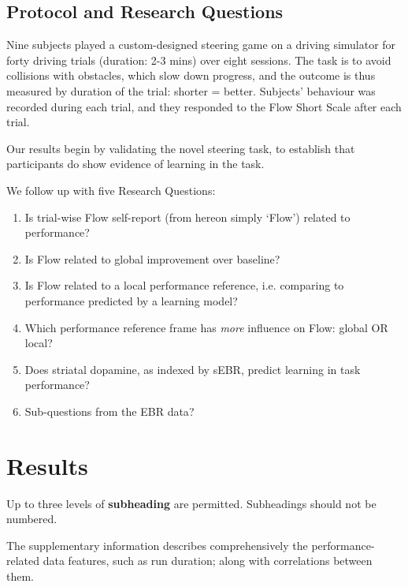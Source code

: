\documentclass[fleqn,10pt]{wlscirep}
\begin{document}
\subsection*{Protocol and Research Questions}
Nine subjects played a custom-designed steering game on a driving simulator for forty driving trials (duration: 2-3 mins) over eight sessions. The task is to avoid collisions with obstacles, which slow down progress, and the outcome is thus measured by duration of the trial: shorter = better. Subjects' behaviour was recorded during each trial, and they responded to the Flow Short Scale after each trial.

Our results begin by validating the novel steering task, to establish that participants do show evidence of learning in the task.

We follow up with five Research Questions:
\begin{enumerate}
	\item Is trial-wise Flow self-report (from hereon simply `Flow') related to performance?
	\item Is Flow related to global improvement over baseline?
	\item Is Flow related to a local performance reference, i.e. comparing to performance predicted by a learning model?
	\item Which performance reference frame has {\it more} influence on Flow: global OR local?

	\item Does striatal dopamine, as indexed by sEBR, predict learning in task performance?
	\item {\sf Sub-questions from the EBR data}?
\end{enumerate}


\section*{Results}
{\sf Up to three levels of \textbf{subheading} are permitted. Subheadings should not be numbered.}

The supplementary information describes comprehensively the performance-related data features, such as run duration; along with correlations between them.
\end{document}
